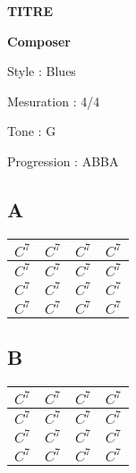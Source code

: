 \documentclass[a4paper,10pt]{article}
\newcommand{\chord}[2]{#1^{#2}}
\begin{document}
\begin{center}
\textbf{{\huge TITRE}}
\end{center}

\begin{center}
\textbf{{\large Composer}}
\end{center}

\begin{Large}
Style : Blues

Mesuration : 4/4

Tone : G

Progression : ABBA\\
\end{Large}


\begin{huge}
\section*{A}
\begin{tabular}{|c|c|c|c|}
    \hline
$\chord{C}{7}$  & $\chord{C}{7}$  & $\chord{C}{7}$  & $\chord{C}{7}$ \\
    \hline
$\chord{C}{7}$  & $\chord{C}{7}$  & $\chord{C}{7}$  & $\chord{C}{7}$ \\
    \hline
$\chord{C}{7}$  & $\chord{C}{7}$  & $\chord{C}{7}$  & $\chord{C}{7}$ \\
    \hline
$\chord{C}{7}$  & $\chord{C}{7}$  & $\chord{C}{7}$  & $\chord{C}{7}$ \\
	\hline
\end{tabular}
\end{huge}


\begin{huge}
\section*{B}
\begin{tabular}{|c|c|c|c|}
    \hline
$\chord{C}{7}$  & $\chord{C}{7}$  & $\chord{C}{7}$  & $\chord{C}{7}$ \\
    \hline
$\chord{C}{7}$  & $\chord{C}{7}$  & $\chord{C}{7}$  & $\chord{C}{7}$ \\
    \hline
$\chord{C}{7}$  & $\chord{C}{7}$  & $\chord{C}{7}$  & $\chord{C}{7}$ \\
    \hline
$\chord{C}{7}$  & $\chord{C}{7}$  & $\chord{C}{7}$  & $\chord{C}{7}$ \\
	\hline
\end{tabular}
\end{huge}

\clearpage
\end{document}
